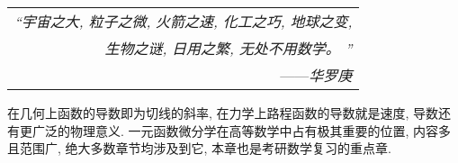 \begin{flushright}
    \begin{tabular}{r|}
        \textit{“宇宙之大, 粒子之微, 火箭之速, 化工之巧, 地球之变, }\\
        \textit{生物之谜, 日用之繁, 无处不用数学。 ”}\\
        ——\textit{华罗庚}
    \end{tabular}
\end{flushright}

在几何上函数的导数即为切线的斜率, 在力学上路程函数的导数就是速度, 导数还有更广泛的物理意义.
一元函数微分学在高等数学中占有极其重要的位置, 内容多且范围广, 绝大多数章节均涉及到它, 
本章也是考研数学复习的重点章.
